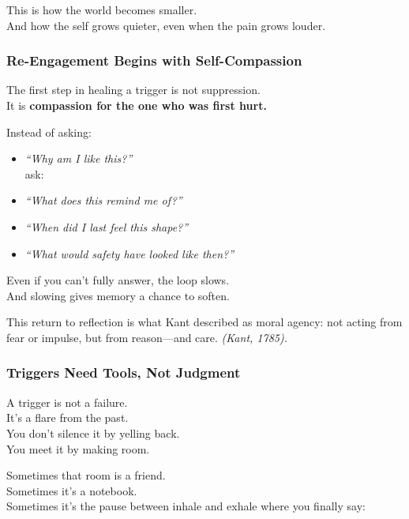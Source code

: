 This is how the world becomes smaller.\\
And how the self grows quieter, even when the pain grows louder.

\subsubsection{\texorpdfstring{\textbf{Re-Engagement Begins with
Self-Compassion}}{Re-Engagement Begins with Self-Compassion}}\label{re-engagement-begins-with-self-compassion}

The first step in healing a trigger is not suppression.\\
It is \textbf{compassion for the one who was first hurt.}

Instead of asking:

\begin{itemize}
\item
  \emph{``Why am I like this?''\\
  } ask:
\item
  \emph{``What does this remind me of?''\\
  }
\item
  \emph{``When did I last feel this shape?''\\
  }
\item
  \emph{``What would safety have looked like then?''\\
  }
\end{itemize}

Even if you can't fully answer, the loop slows.\\
And slowing gives memory a chance to soften.

This return to reflection is what Kant described as moral agency: not
acting from fear or impulse, but from reason---and care. \emph{(Kant,
1785).}

\subsubsection{\texorpdfstring{\textbf{Triggers Need Tools, Not
Judgment}}{Triggers Need Tools, Not Judgment}}\label{triggers-need-tools-not-judgment}

A trigger is not a failure.\\
It's a flare from the past.\\
You don't silence it by yelling back.\\
You meet it by making room.

Sometimes that room is a friend.\\
Sometimes it's a notebook.\\
Sometimes it's the pause between inhale and exhale where you finally
say:

